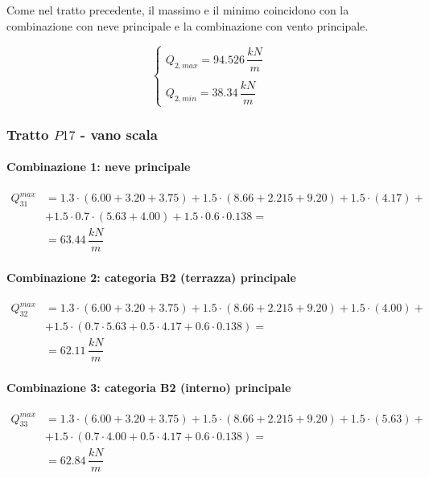 Come nel tratto precedente, il massimo e il minimo coincidono con la combinazione con neve principale e la combinazione con vento principale.

\begin{equation}
		\label{eq:Q2maxmin_slu}
		\begin{cases}
			Q_{2,max} = 94.526\,\dfrac{kN}{m}\\\\
			Q_{2, min} = 38.34\,\dfrac{kN}{m}
		\end{cases}
\end{equation}

\subsubsection*{Tratto $P17$ - vano scala}

\paragraph{Combinazione 1: neve principale}

\begin{align*}
	Q_{31}^{max} &= 1.3\cdot(6.00+3.20 + 3.75) + 1.5\cdot(8.66+2.215 + 9.20) + 1.5\cdot(4.17) +\\
	&+1.5\cdot0.7\cdot(5.63+4.00) + 1.5\cdot0.6\cdot0.138 =\\
	&= 	63.44\,\dfrac{kN}{m}
\end{align*}

\paragraph{Combinazione 2: categoria B2 (terrazza) principale}

\begin{align*}
	Q_{32}^{max} &= 1.3\cdot(6.00+3.20 + 3.75) + 1.5\cdot(8.66+2.215 + 9.20) + 1.5\cdot(4.00) +\\
	&+1.5\cdot(0.7\cdot5.63+ 0.5\cdot4.17 + 0.6\cdot 0.138) =\\
	&=  62.11\,\dfrac{kN}{m}
\end{align*}

\paragraph{Combinazione 3: categoria B2 (interno) principale}

\begin{align*}
	Q_{33}^{max} &= 1.3\cdot(6.00+3.20 + 3.75) + 1.5\cdot(8.66+2.215 + 9.20) + 1.5\cdot(5.63) +\\
	&+1.5\cdot(0.7\cdot4.00+ 0.5\cdot4.17 + 0.6\cdot 0.138) =\\
	&=  62.84\,\dfrac{kN}{m}
\end{align*}

